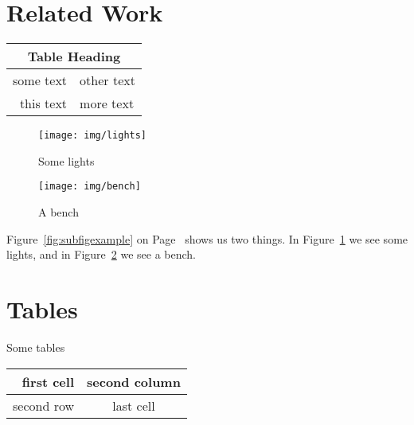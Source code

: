 \documentclass[12pt,twoside,a4paper]{article}
\begin{document}
\lipsum[1-4]

\section{Related Work}
\singlespacing

\lipsum[5-6]

\begin{table}[ht]

	\begin{tabular}{ | r | l | }
    	\hline
    	\multicolumn{2}{|c|}{Table Heading} \\
    	\hline
    		some text & other text \\
			this text & more text \\
    	\hline
	\end{tabular}

\end{table}

	\begin{figure*}[htb]
	    \centering
	    \begin{subfigure}[b]{0.3\textwidth}
	        \texttt{[image: img/lights]}
	        \caption{Some lights}
	        \label{fig:lights}
	    \end{subfigure}
	    \begin{subfigure}[b]{0.3\textwidth}
	        \texttt{[image: img/bench]}
	        \caption{A bench}
	        \label{fig:bench}
	    \end{subfigure}
	    \caption{Some lights and a bench}
	    \label{fig:subfigexample}
	\end{figure*}
	
Figure~\ref{fig:subfigexample} on Page~\pageref{fig:subfigexample} shows us two things. In Figure~\ref{fig:lights} we see some lights, and in Figure~\ref{fig:bench} we see a bench.

\lipsum[5-6]

\section{Tables}

Some tables

\vspace{0.2in}

\begin{tabular}{| r | c |}
\hline
first cell & second column \\
\hline
second row & last cell \\
\hline
\end{tabular}
\end{document}
